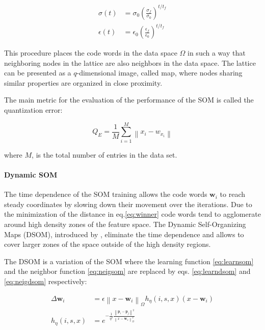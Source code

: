 \begin{align}
\sigma(t) & = \sigma_0 \left(\frac{\sigma_f}{\sigma_0}\right)^{t/t_f} \label{eq:sigma} \\
\epsilon(t) & = \epsilon_0 \left(\frac{\epsilon_f}{\epsilon_0}\right)^{t/t_f} \label{eq:epsilon}
\end{align}

This procedure places the code words in the data space $\Omega$ in such a way that neighboring nodes in the lattice are also neighbors in the data space. The lattice can be presented as a $q$-dimensional image, called map, where nodes sharing similar properties are organized in close proximity.

The main metric for the evaluation of the performance of the SOM is called the quantization error:

\begin{equation}
Q_E = \frac{1}{M} \sum_{i=1}^M \left\lVert x_i - w_{x_i} \right\rVert
\end{equation}

where $M$, is the total number of entries in the data set.

\paragraph{Dynamic SOM}
The time dependence of the SOM training allows the code words $\boldsymbol{w}_i$ to reach steady coordinates by slowing down their movement over the iterations. Due to the minimization of the distance in eq.\eqref{eq:winner} code words tend to agglomerate around high density zones of the feature space. The Dynamic Self-Organizing Maps (DSOM), introduced by \citep{Rougier2011}, eliminate the time dependence and allows to cover larger zones of the space outside of the high density regions.

The DSOM is a variation of the SOM where the learning function \eqref{eq:learnsom} and the neighbor function \eqref{eq:neigsom} are replaced by eqs. \eqref{eq:learndsom} and \eqref{eq:neigdsom} respectively:

\begin{align}
\Delta \boldsymbol{w}_i & = \epsilon \left\lVert x - \boldsymbol{w}_i \right\rVert_\Omega h_\eta(i,s,x)(x-\boldsymbol{w}_i) \label{eq:learndsom} \\
h_\eta(i,s,x) & = e^{-\frac{1}{\eta^2}\frac{\left\lVert \boldsymbol{p}_i - \boldsymbol{p}_j \right\rVert^2}{\left\lVert x - \boldsymbol{w}_s \right\rVert_\Omega^2}} \label{eq:neigdsom} 
\end{align}

